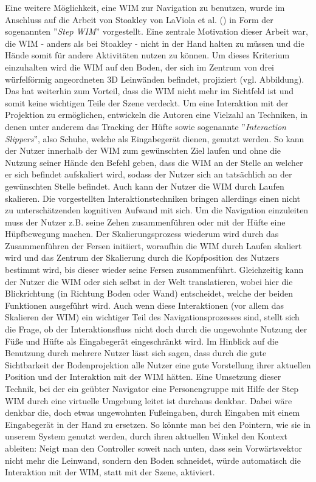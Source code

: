 Eine weitere Möglichkeit, eine WIM zur Navigation zu benutzen, wurde im Anschluss auf die Arbeit von Stoakley von LaViola et al. (\cite{LaViola2004Hands-freeEnvironments}) in Form der sogenannten  ”\textit{Step WIM}”  vorgestellt.
Eine zentrale Motivation dieser Arbeit war, die WIM - anders als bei Stoakley - nicht in der Hand halten zu müssen und die Hände somit für andere Aktivitäten nutzen zu können. 
Um dieses Kriterium einzuhalten wird die WIM auf den Boden, der sich im Zentrum von drei würfelförmig angeordneten 3D Leinwänden befindet, projiziert (vgl. Abbildung). Das hat weiterhin zum Vorteil, dass die WIM nicht mehr im Sichtfeld ist und somit keine wichtigen Teile der Szene verdeckt. 
Um eine Interaktion mit der Projektion zu ermöglichen, entwickeln die Autoren eine Vielzahl an Techniken, in denen unter anderem das Tracking der Hüfte sowie sogenannte ”\textit{Interaction Slippers}”, also Schuhe, welche als Eingabegerät dienen, genutzt werden.
So kann der Nutzer innerhalb der WIM zum gewünschten Ziel laufen und ohne die Nutzung seiner Hände den Befehl geben, dass die WIM an der Stelle an welcher er sich befindet aufskaliert wird, sodass der Nutzer sich an tatsächlich an der gewünschten Stelle befindet.
Auch kann der Nutzer die WIM durch Laufen skalieren. Die vorgestellten Interaktionstechniken bringen allerdings einen nicht zu unterschätzenden kognitiven Aufwand mit sich. 
Um die Navigation einzuleiten muss der Nutzer z.B. seine Zehen zusammenführen oder mit der Hüfte eine Hüpfbewegung machen. Der Skalierungsprozess wiederum wird durch das Zusammenführen der Fersen initiiert, woraufhin die WIM durch Laufen skaliert wird und das Zentrum der Skalierung durch die Kopfposition des Nutzers bestimmt wird, bis dieser wieder seine Fersen zusammenführt. Gleichzeitig kann der Nutzer die WIM oder sich selbst in der Welt translatieren, wobei hier die Blickrichtung (in Richtung Boden oder Wand) entscheidet, welche der beiden Funktionen ausgeführt wird.
Auch wenn diese Interaktionen (vor allem das Skalieren der WIM) ein wichtiger Teil des Navigationsprozesses sind, stellt sich die Frage, ob der Interaktionsfluss nicht doch durch die ungewohnte Nutzung der Füße und Hüfte als Eingabegerät eingeschränkt wird.
Im Hinblick auf die Benutzung durch mehrere Nutzer lässt sich sagen, dass durch die gute Sichtbarkeit der Bodenprojektion alle Nutzer eine gute Vorstellung ihrer aktuellen Position und der Interaktion mit der WIM hätten. Eine Umsetzung dieser Technik, bei der ein geübter Navigator eine Personengruppe mit Hilfe der Step WIM durch eine virtuelle Umgebung leitet ist durchaus denkbar. Dabei wäre denkbar die, doch etwas ungewohnten Fußeingaben, durch Eingaben mit einem Eingabegerät in der Hand zu ersetzen. So könnte man bei den Pointern, wie sie in unserem System genutzt werden, durch ihren aktuellen Winkel den Kontext ableiten: Neigt man den Controller soweit nach unten, dass sein Vorwärtsvektor nicht mehr die Leinwand, sondern den Boden schneidet, würde automatisch die Interaktion mit der WIM, statt mit der Szene, aktiviert.\\

